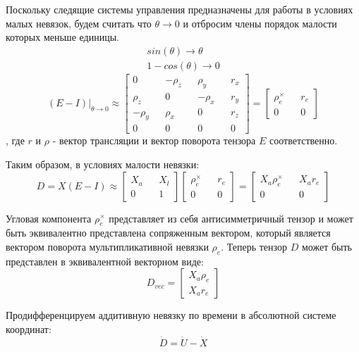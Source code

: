 \documentclass[a4paper]{article}
\begin{document}
Поскольку следящие системы управления предназначены для работы в условиях малых невязок, будем считать что $\theta \rightarrow 0$ и отбросим члены порядок малости которых меньше единицы.
\begin{eqnarray}
sin(\theta) \rightarrow \theta\\
1 - cos(\theta) \rightarrow 0
\end{eqnarray}
\begin{equation}
(E - I)|_{\theta\rightarrow0} \approx 
\begin{bmatrix}
0         && -\rho_z &&  \rho_y && r_x\\
 \rho_z && 0         && -\rho_x && r_y\\
-\rho_y &&  \rho_x && 0         && r_z\\
0&&0&&0&&0
\end{bmatrix} = \begin{bmatrix}\rho_e^\times&&r_e\\0&&0\end{bmatrix}
\end{equation}
, где $r$ и $\rho$ - вектор трансляции и вектор поворота тензора $E$ соответственно.

Таким образом, в условиях малости невязки:
\begin{equation} D = X (E-I) \approx \begin{bmatrix}X_a&&X_l\\0&&1\end{bmatrix} \begin{bmatrix}\rho_e^\times&&r_e\\0&&0\end{bmatrix} = \begin{bmatrix}X_a\rho_e^\times&&X_ar_e\\0&&0\end{bmatrix} \end{equation}

Угловая компонента $\rho_e^\times$ представляет из себя антисимметричный тензор и может быть эквивалентно представлена сопряженным вектором, который является вектором поворота мультипликативной невязки $\rho_e$.  Теперь тензор $D$ может быть представлен в эквивалентной векторном виде:
\begin{equation} D_{vec} = \begin{bmatrix}X_a\rho_e\\X_ar_e\end{bmatrix} \end{equation}

Продифференцируем аддитивную невязку по времени в абсолютной системе координат:
\begin{equation} \dot{D} = \dot{U} -\dot{X} \end{equation}
\end{document}
